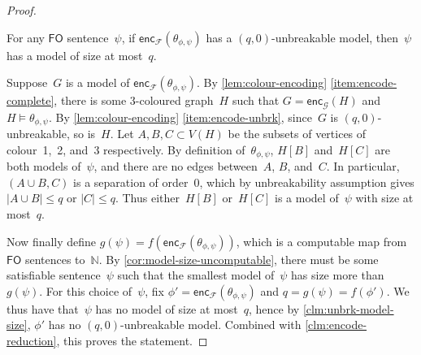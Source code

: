 \documentclass[10pt,a4paper]{amsart}
\newcommand{\Nn}{\mathbb{N}}
\newcommand{\encF}{\mathsf{enc}_{\mathcal{F}}}
\newcommand{\encG}{\mathsf{enc}_{\mathcal{G}}}
\newcommand{\fo}{\ensuremath{\mathsf{FO}}\xspace}
\begin{document}
\begin{proof}
    \begin{claim}\label{clm:unbrk-model-size}
        For any \fo sentence~$\psi$, if $\encF(\theta_{\phi,\psi})$ has a $(q,0)$-unbreakable model, then~$\psi$ has a model of size at most~$q$.
    \end{claim}
    \begin{claimproof}
        Suppose~$G$ is a model of $\encF(\theta_{\phi,\psi})$.
        By \cref{lem:colour-encoding} \eqref{item:encode-complete}, there is some 3-coloured graph~$H$ such that $G = \encG(H)$ and $H \models \theta_{\phi,\psi}$.
        By \cref{lem:colour-encoding} \eqref{item:encode-unbrk}, since~$G$ is $(q,0)$-unbreakable, so is~$H$.
        Let $A,B,C \subset V(H)$ be the subsets of vertices of colour~1,~2, and~3 respectively.
        By definition of~$\theta_{\phi,\psi}$, $H[B]$ and~$H[C]$ are both models of~$\psi$, and there are no edges between~$A$, $B$, and~$C$.
        In particular, $(A \cup B, C)$ is a separation of order~0, which by unbreakability assumption gives $|A \cup B| \le q$ or $|C| \le q$.
        Thus either~$H[B]$ or~$H[C]$ is a model of~$\psi$ with size at most~$q$.
    \end{claimproof}

    Now finally define $g(\psi) = f(\encF(\theta_{\phi,\psi}))$, which is a computable map from \fo sentences to~$\Nn$.
    By \cref{cor:model-size-uncomputable}, there must be some satisfiable sentence~$\psi$ such that the smallest model of~$\psi$ has size more than~$g(\psi)$.
    For this choice of~$\psi$, fix $\phi' = \encF(\theta_{\phi,\psi})$ and $q = g(\psi) = f(\phi')$.
    We thus have that~$\psi$ has no model of size at most~$q$, hence by \cref{clm:unbrk-model-size}, $\phi'$ has no $(q,0)$-unbreakable model.
    Combined with \cref{clm:encode-reduction}, this proves the statement.
\end{proof}
\end{document}
